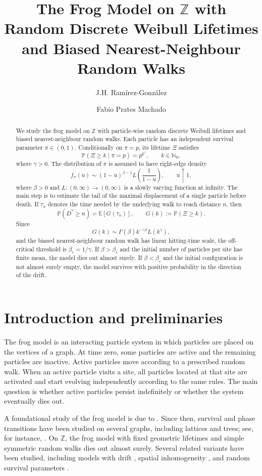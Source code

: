 \documentclass[reqno,final,11pt]{amsart}
\title[The frog model with random Weibull lifetimes]
{The Frog Model on \(\mathbb Z\) with Random Discrete Weibull Lifetimes and Biased Nearest-Neighbour Random Walks}
\author[J.H. Ram\'irez-Gonz\'alez]{J.H. Ram\'irez-Gonz\'alez}
\author[F.P. Machado]{Fabio Prates Machado}
\newcommand{\Nzero}{\mathbb N_0}
\newcommand{\E}{\mathbb E}
\newcommand{\Pbb}{\mathbb P}
\theoremstyle{plain}
\theoremstyle{definition}
\theoremstyle{remark}
\numberwithin{equation}{section}
\begin{document}
\begin{abstract}
We study the frog model on \(\mathbb Z\) with particle-wise random discrete
Weibull lifetimes and biased nearest-neighbour random walks. Each particle has
an independent survival parameter \(\pi\in(0,1)\). Conditionally on \(\pi=p\),
its lifetime \(\Xi\) satisfies
\[
  \Pbb(\Xi\ge k\mid \pi=p)=p^{k^\gamma},
  \qquad k\in\Nzero,
\]
where \(\gamma>0\). The distribution of \(\pi\) is assumed to have right-edge
density
\[
  f_\pi(u)\sim (1-u)^{\beta-1}
  L\left(\frac1{1-u}\right),
  \qquad u\uparrow1,
\]
where \(\beta>0\) and \(L:(0,\infty)\to(0,\infty)\) is a slowly varying function at infinity. The main step is to
estimate the tail of the maximal displacement of a single particle before
 death. If \(\tau_n\) denotes the time needed by the underlying walk to reach
 distance \(n\), then
\[
  \Pbb(D^*\ge n)=\E[G(\tau_n)],
  \qquad
  G(k):=\Pbb(\Xi\ge k).
\]
Since
\[
  G(k)\sim \Gamma(\beta)k^{-\gamma\beta}L(k^\gamma),
\]
and the biased nearest-neighbour random walk has linear hitting-time scale, the off-critical
threshold is \(\beta_c=1/\gamma\). If \(\beta>\beta_c\) and the initial number
of particles per site has finite mean, the model dies out almost surely. If \(\beta<\beta_c\) and the initial configuration is not almost surely empty,
the model survives with positive probability in the direction of the drift.
\end{abstract}

\maketitle


\section{Introduction and preliminaries}

The frog model is an interacting particle system in which particles are placed
on the vertices of a graph. At time zero, some particles are active and the
remaining particles are inactive. Active particles move according to a prescribed
random walk. When an active particle visits a site, all particles located at
that site are activated and start evolving independently according to the same
rules. The main question is whether active particles persist indefinitely or
whether the system eventually dies out.

A foundational study of the frog model is due to \cite{AlvesMachadoPopov2002}. Since then, survival and phase transitions have been studied on several graphs, including lattices and trees; see, for instance, \cite{FontesMachadoSarkar2004,LebensztaynMachadoPopov2005}. On \(\mathbb Z\), the frog model with fixed geometric lifetimes and simple symmetric random walks dies out almost surely. Several related variants have been studied, including models with drift \cite{GantertSchmidt2009}, spatial inhomogeneity \cite{BertacchiMachadoZucca2014}, and random survival parameters \cite{CarvalhoMachado}.
\end{document}
